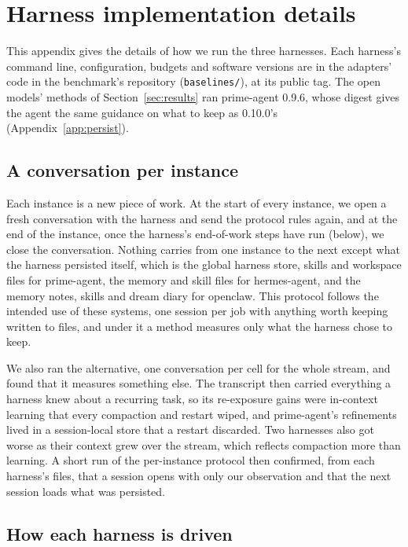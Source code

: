 \section{Harness implementation details}
\label{app:harness}

This appendix gives the details of how we run the three harnesses. Each harness's command line, configuration, budgets and software versions are in the adapters' code in the benchmark's repository (\texttt{baselines/}), at its public tag. The open models' methods of Section~\ref{sec:results} ran prime-agent 0.9.6, whose digest gives the agent the same guidance on what to keep as 0.10.0's (Appendix~\ref{app:persist}).

\subsection{A conversation per instance}
\label{app:per-instance}

Each instance is a new piece of work. At the start of every instance, we open a fresh conversation with the harness and send the protocol rules again, and at the end of the instance, once the harness's end-of-work steps have run (below), we close the conversation. Nothing carries from one instance to the next except what the harness persisted itself, which is the global harness store, skills and workspace files for prime-agent, the memory and skill files for hermes-agent, and the memory notes, skills and dream diary for openclaw. This protocol follows the intended use of these systems, one session per job with anything worth keeping written to files, and under it a method measures only what the harness chose to keep.

We also ran the alternative, one conversation per cell for the whole stream, and found that it measures something else. The transcript then carried everything a harness knew about a recurring task, so its re-exposure gains were in-context learning that every compaction and restart wiped, and prime-agent's refinements lived in a session-local store that a restart discarded. Two harnesses also got worse as their context grew over the stream, which reflects compaction more than learning. A short run of the per-instance protocol then confirmed, from each harness's files, that a session opens with only our observation and that the next session loads what was persisted.

\subsection{How each harness is driven}


